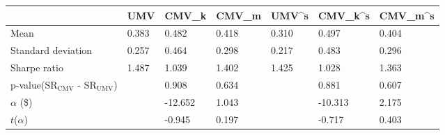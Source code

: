 \begin{tabular}{lllllll}
\toprule
 & UMV & CMV_k & CMV_m & UMV^s & CMV_k^s & CMV_m^s \\
\midrule
Mean & 0.383 & 0.482 & 0.418 & 0.310 & 0.497 & 0.404 \\
Standard deviation & 0.257 & 0.464 & 0.298 & 0.217 & 0.483 & 0.296 \\
Sharpe ratio & 1.487 & 1.039 & 1.402 & 1.425 & 1.028 & 1.363 \\
p-value(SR$_{\text{CMV}}$ - SR$_{\text{UMV}}$) &  & 0.908 & 0.634 &  & 0.881 & 0.607 \\
$\alpha$ (\$) &  & -12.652 & 1.043 &  & -10.313 & 2.175 \\
$t$($\alpha$) &  & -0.945 & 0.197 &  & -0.717 & 0.403 \\
\bottomrule
\end{tabular}
